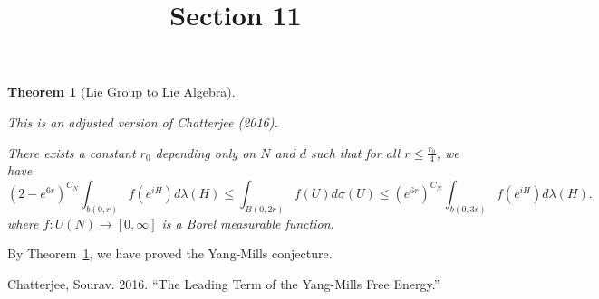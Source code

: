 \documentclass[
  a4paper,
]{article}
\title{Section 11}
\author{}
\date{}
\newlength{\cslhangindent}
\newenvironment{CSLReferences}[2] %
 {\begin{list}{}{%
  \setlength{\itemindent}{0pt}
  \setlength{\leftmargin}{0pt}
  \setlength{\parsep}{0pt}
  \ifodd #1
   \setlength{\leftmargin}{\cslhangindent}
   \setlength{\itemindent}{-1\cslhangindent}
  \fi
  \setlength{\itemsep}{#2\baselineskip}}}
 {\end{list}}
\theoremstyle{plain}
\newtheorem{theorem}{Theorem}[section]
\theoremstyle{remark}
\begin{document}
\maketitle


\begin{theorem}[Lie Group to Lie
Algebra]\protect\hypertarget{thm-LieGrouptoLieAlgebra}{}\label{thm-LieGrouptoLieAlgebra}

This is an adjusted version of Chatterjee (2016).

There exists a constant \(r_0\) depending only on \(N\) and \(d\) such
that for all \(r \le \frac{r_0}{4}\), we have \[
(2-e^{6r})^{C_N} \int_{b(0,r)} f(e^{iH}) d\lambda(H) 
\le \int_{B(0,2r)} f(U) d\sigma(U) \le (e^{6r})^{C_N} \int_{b(0,3r)} f(e^{iH}) d\lambda(H). 
\] where \(f: U(N) \to [0,\infty]\) is a Borel measurable function.

\end{theorem}

By Theorem~\ref{thm-LieGrouptoLieAlgebra}, we have proved the Yang-Mills
conjecture.

\label{refs}
\begin{CSLReferences}{1}{0}
Chatterjee, Sourav. 2016. {``The Leading Term of the Yang-Mills Free
Energy.''}

\end{CSLReferences}
\end{document}
